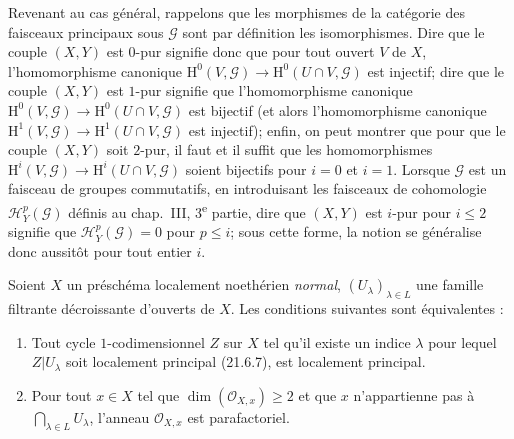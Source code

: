 \begin{remark}[21.13.13]
Revenant au cas général, rappelons que les morphismes de la catégorie des faisceaux
principaux sous $\mathscr G$ sont par définition les isomorphismes. Dire que le couple
$(X,Y)$ est $0$-pur signifie donc que pour tout ouvert $V$ de $X$, l'homomorphisme
canonique $\mathrm H^0(V,\mathscr G)\to\mathrm H^0(U\cap V,\mathscr G)$ est injectif;
dire que le couple $(X,Y)$ est $1$-pur signifie que l'homomorphisme canonique
$\mathrm H^0(V,\mathscr G)\to\mathrm H^0(U\cap V,\mathscr G)$ est bijectif (et alors
l'homomorphisme canonique
$\mathrm H^1(V,\mathscr G)\to\mathrm H^1(U\cap V,\mathscr G)$ est injectif); enfin,
on peut montrer que pour que le couple $(X,Y)$ soit $2$-pur, il faut et il suffit que
les homomorphismes
$\mathrm H^i(V,\mathscr G)\to\mathrm H^i(U\cap V,\mathscr G)$ soient bijectifs pour
$i=0$ et $i=1$. Lorsque $\mathscr G$ est un faisceau de groupes commutatifs, en
introduisant les faisceaux de cohomologie $\mathscr H_Y^p(\mathscr G)$ définis au
chap.~III, 3\textsuperscript{e} partie, dire que $(X,Y)$ est $i$-pur pour $i\leq2$
signifie que $\mathscr H_Y^p(\mathscr G)=0$ pour $p\leq i$; sous cette forme, la
notion se généralise donc aussitôt pour tout entier $i$.
\end{remark}

\begin{proposition}[21.13.14]
\label{IV.21.13.14}
Soient $X$ un préschéma localement noethérien \emph{normal},
$(U_\lambda)_{\lambda\in L}$ une famille filtrante décroissante d'ouverts de $X$. Les
conditions suivantes sont équivalentes :
\begin{enumerate}[label=\emph{\alph*)}]
  \item Tout cycle $1$-codimensionnel $Z$ sur $X$ tel qu'il existe un indice
  $\lambda$ pour lequel $Z|U_\lambda$ soit localement principal (21.6.7), est
  localement principal.
  \item Pour tout $x\in X$ tel que $\dim(\mathcal O_{X,x})\geq2$ et que $x$
  n'appartienne pas à $\bigcap_{\lambda\in L}U_\lambda$, l'anneau
  $\mathcal O_{X,x}$ est parafactoriel.
\end{enumerate}
\end{proposition}

